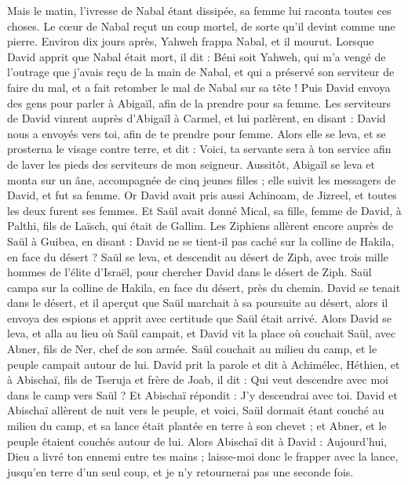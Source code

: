 \begin{multicols}{2}
Mais le matin, l’ivresse de Nabal étant dissipée, sa femme lui raconta toutes ces choses. Le cœur de Nabal reçut un coup mortel, de sorte qu'il devint comme une pierre.
Environ dix jours après, Yahweh frappa Nabal, et il mourut.
Lorsque David apprit que Nabal était mort, il dit : Béni soit Yahweh, qui m'a vengé de l'outrage que j'avais reçu de la main de Nabal, et qui a préservé son serviteur de faire du mal, et a fait retomber le mal de Nabal sur sa tête ! Puis David envoya des gens pour parler à Abigaïl, afin de la prendre pour sa femme.
Les serviteurs de David vinrent auprès d'Abigaïl à Carmel, et lui parlèrent, en disant : David nous a envoyés vers toi, afin de te prendre pour femme.
Alors elle se leva, et se prosterna le visage contre terre, et dit : Voici, ta servante sera à ton service afin de laver les pieds des serviteurs de mon seigneur.
Aussitôt, Abigaïl se leva et monta sur un âne, accompagnée de cinq jeunes filles ; elle suivit les messagers de David, et fut sa femme.
Or David avait pris aussi Achinoam, de Jizreel, et toutes les deux furent ses femmes.
Et Saül avait donné Mical, sa fille, femme de David, à Palthi, fils de Laïsch, qui était de Gallim.
\VerseOne{}Les Ziphiens allèrent encore auprès de Saül à Guibea, en disant : David ne se tient-il pas caché sur la colline de Hakila, en face du désert ?
Saül se leva, et descendit au désert de Ziph, avec trois mille hommes de l'élite d'Israël, pour chercher David dans le désert de Ziph.
Saül campa sur la colline de Hakila, en face du désert, près du chemin. David se tenait dans le désert, et il aperçut que Saül marchait à sa poursuite au désert,
alors il envoya des espions et apprit avec certitude que Saül était arrivé.
Alors David se leva, et alla au lieu où Saül campait, et David vit la place où couchait Saül, avec Abner, fils de Ner, chef de son armée. Saül couchait au milieu du camp, et le peuple campait autour de lui.
David prit la parole et dit à Achimélec, Héthien, et à Abischaï, fils de Tseruja et frère de Joab, il dit : Qui veut descendre avec moi dans le camp vers Saül ? Et Abischaï répondit : J'y descendrai avec toi.
David et Abischaï allèrent de nuit vers le peuple, et voici, Saül dormait étant couché au milieu du camp, et sa lance était plantée en terre à son chevet ; et Abner, et le peuple étaient couchés autour de lui.
Alors Abischaï dit à David : Aujourd'hui, Dieu a livré ton ennemi entre tes mains ; laisse-moi donc le frapper avec la lance, jusqu'en terre d'un seul coup, et je n'y retournerai pas une seconde fois.

\end{multicols}
